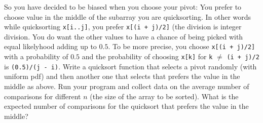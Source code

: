   So you have decided to be biased when
  you choose your pivot:
  You prefer to choose value in the middle
  of the subarray you are quicksorting.
  In other words while quicksorting \verb!x[i..j]!,
  you prefer \verb!x[(i + j)/2]! (the division is integer
  division.
  You do want the other values to have a chance
  of being picked with equal likelyhood adding up to $0.5$.
  To be more precise,
  you choose \verb!x[(i + j)/2]! with a probability
  of $0.5$ and
  the probability of
  choosing \verb!x[k]! for \verb!k! $\neq$ \verb!(i + j)/2!
  is \verb!(0.5)/(j - i)!.
  Write a quicksort function that selects
  a pivot randomly (with uniform pdf) and then another one that
  selects that prefers the value in the middle as above.
  Run your program and collect data on the average number
  of comparisons for different $n$ (the size of the array
  to be sorted).
  What is the expected number of comparisons for the
  quicksort that prefers the value in the middle?
